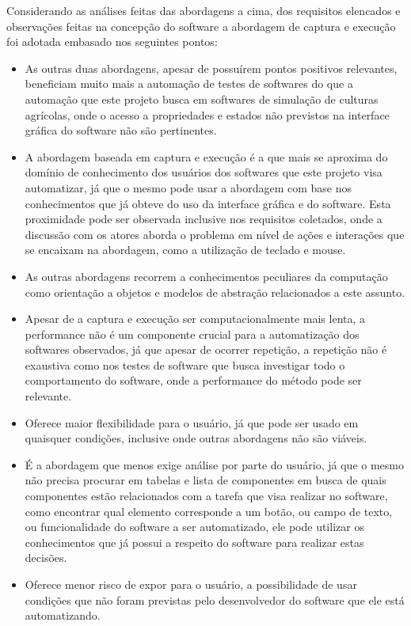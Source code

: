 \documentclass[tg]{mdtufsm}
\begin{document}
                Considerando as análises feitas das abordagens a cima, dos requisitos elencados e observações feitas na concepção do software a abordagem de captura e execução foi adotada embasado nos seguintes pontos:

                \begin{itemize}
                    \item As outras duas abordagens, apesar de possuírem pontos positivos relevantes, beneficiam muito mais a automação de testes de softwares do que a automação que este projeto busca em softwares de simulação de culturas agrícolas, onde o acesso a propriedades e estados não previstos na interface gráfica do software não são pertinentes.

                    \item A abordagem baseada em captura e execução é a que mais se aproxima do domínio de conhecimento dos usuários dos softwares que este projeto visa automatizar, já que o mesmo pode usar a abordagem com base nos conhecimentos que já obteve do uso da interface gráfica e do software. Esta proximidade pode ser observada inclusive nos requisitos coletados, onde a discussão com os atores aborda o problema em nível de ações e interações que se encaixam na abordagem, como a utilização de teclado e mouse.

                    \item As outras abordagens recorrem a conhecimentos peculiares da computação como orientação a objetos e modelos de abstração relacionados a este assunto.

                    \item Apesar de a captura e execução ser computacionalmente mais lenta, a performance não é um componente crucial para a automatização dos softwares observados, já que apesar de ocorrer repetição, a repetição não é exaustiva como nos testes de software que busca investigar todo o comportamento do software, onde a performance do método pode ser relevante.

                    \item Oferece maior flexibilidade para o usuário, já que pode ser usado em quaisquer condições, inclusive onde outras abordagens não são viáveis.

                    \item É a abordagem que menos exige análise por parte do usuário, já que o mesmo não precisa procurar em tabelas e lista de componentes em busca de quais componentes estão relacionados com a tarefa que visa realizar no software, como encontrar qual elemento corresponde a um botão, ou campo de texto, ou funcionalidade do software a ser automatizado, ele pode utilizar os conhecimentos que já possui a respeito do software para realizar estas decisões.

                    \item Oferece menor risco de expor para o usuário, a possibilidade de usar condições que não foram previstas pelo desenvolvedor do software que ele está automatizando.
                \end{itemize}
\end{document}
